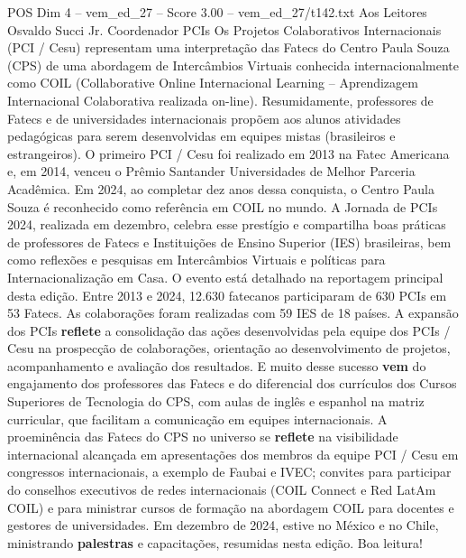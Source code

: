 \begin{textsample}{POS Dim 4 – vem\_ed\_27 – Score 3.00 – vem\_ed\_27/t142.txt}  \label{ex:f4_pos_021}
Aos Leitores Osvaldo Succi Jr.
Coordenador PCIs Os Projetos Colaborativos Internacionais (PCI / Cesu) representam uma interpretação das Fatecs do Centro Paula Souza (CPS) de uma abordagem de Intercâmbios Virtuais conhecida internacionalmente como COIL (Collaborative Online Internacional Learning – Aprendizagem Internacional Colaborativa realizada on-line).
Resumidamente, professores de Fatecs e de universidades internacionais propõem aos alunos atividades pedagógicas para serem desenvolvidas em equipes mistas (brasileiros e estrangeiros).
O primeiro PCI / Cesu foi realizado em 2013 na Fatec Americana e, em 2014, venceu o Prêmio Santander Universidades de Melhor Parceria Acadêmica.
Em 2024, ao completar dez anos dessa conquista, o Centro Paula Souza é reconhecido como referência em COIL no mundo.
A Jornada de PCIs 2024, realizada em dezembro, celebra esse prestígio e compartilha boas práticas de professores de Fatecs e Instituições de Ensino Superior (IES) brasileiras, bem como reflexões e pesquisas em Intercâmbios Virtuais e políticas para Internacionalização em Casa.
O evento está detalhado na reportagem principal desta edição.
Entre 2013 e 2024, 12.630 fatecanos participaram de 630 PCIs em 53 Fatecs.
As colaborações foram realizadas com 59 IES de 18 países.
A expansão dos PCIs \textbf{reflete} a consolidação das ações desenvolvidas pela equipe dos PCIs / Cesu na prospecção de colaborações, orientação ao desenvolvimento de projetos, acompanhamento e avaliação dos resultados.
E muito desse sucesso \textbf{vem} do engajamento dos professores das Fatecs e do diferencial dos currículos dos Cursos Superiores de Tecnologia do CPS, com aulas de inglês e espanhol na matriz curricular, que facilitam a comunicação em equipes internacionais.
A proeminência das Fatecs do CPS no universo se \textbf{reflete} na visibilidade internacional alcançada em apresentações dos membros da equipe PCI / Cesu em congressos internacionais, a exemplo de Faubai e IVEC; convites para participar do conselhos executivos de redes internacionais (COIL Connect e Red LatAm COIL) e para ministrar cursos de formação na abordagem COIL para docentes e gestores de universidades.
Em dezembro de 2024, estive no México e no Chile, ministrando \textbf{palestras} e capacitações, resumidas nesta edição.
Boa leitura!

\end{textsample}

